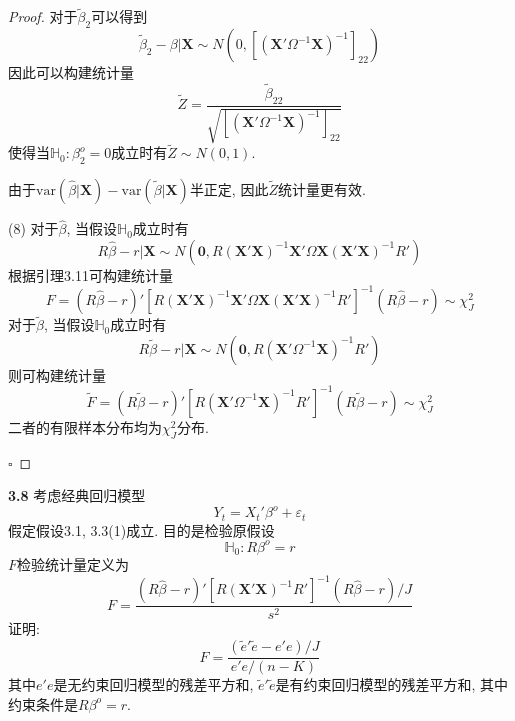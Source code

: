 \documentclass[cn,12pt,math=mtpro2,citestyle=gb7714-2015,bibstyle=gb7714-2015,twocol,mode=simple]{elegantbook}
\newcommand{\var}{\text{var}}
\newcommand{\hbeta}{\hat{\beta}}
\newcommand{\tbeta}{\tilde{\beta}}
\begin{document}
\begin{proof}
   对于$\tbeta_2$可以得到
   $$\tbeta_2-\beta|\mathbf{X}\sim N(0,[(\mathbf{X}'\Omega^{-1}\mathbf{X})^{-1}]_{22})$$
   因此可以构建统计量
   $$\tilde{Z}=\frac{\tbeta_{22}}{\sqrt{[(\mathbf{X}'\Omega^{-1}\mathbf{X})^{-1}]_{22}}}$$
   使得当$\mathbb{H}_0: \beta_2^o=0$成立时有$\tilde{Z}\sim N(0,1)$.

   由于$\var(\hbeta|\mathbf{X})-\var(\tbeta|\mathbf{X})$半正定, 因此$\tilde{Z}$统计量更有效.

   (8) 对于$\hbeta$, 当假设$\mathbb{H}_0$成立时有
   $$R\hbeta-r|\mathbf{X}\sim N(\mathbf{0},R(\mathbf{X}'\mathbf{X})^{-1}\mathbf{X}'\Omega \mathbf{X}(\mathbf{X}'\mathbf{X})^{-1}R')$$
   根据引理3.11可构建统计量
   $$F=(R\hbeta-r)'[R(\mathbf{X}'\mathbf{X})^{-1}\mathbf{X}'\Omega \mathbf{X}(\mathbf{X}'\mathbf{X})^{-1}R']^{-1}(R\hbeta-r)\sim \chi^2_J$$
   对于$\tbeta$, 当假设$\mathbb{H}_0$成立时有
   $$R\tbeta-r|\mathbf{X}\sim N(\mathbf{0}, R(\mathbf{X}'\Omega^{-1}\mathbf{X})^{-1}R')$$
   则可构建统计量
   $$\tilde{F}=(R\tbeta-r)'[R(\mathbf{X}'\Omega^{-1}\mathbf{X})^{-1}R']^{-1}(R\tbeta-r)\sim \chi^2_J$$
   二者的有限样本分布均为$\chi^2_J$分布.

   $\square$
\end{proof}

\textbf{3.8} 考虑经典回归模型
$$Y_t=X_t'\beta^o+\varepsilon_t$$
假定假设3.1, 3.3(1)成立. 目的是检验原假设
$$\mathbb{H}_0: R\beta^o=r$$
$F$检验统计量定义为
$$F=\frac{(R\hbeta-r)'[R(\mathbf{X}'\mathbf{X})^{-1}R']^{-1}(R\hbeta-r)/J}{s^2}$$
证明:
$$F=\frac{(\tilde{e}'\tilde{e}-e'e)/J}{e'e/(n-K)}$$
其中$e'e$是无约束回归模型的残差平方和, $\tilde{e}'\tilde{e}$是有约束回归模型的残差平方和, 其中约束条件是$R\beta^o=r$.
\end{document}
